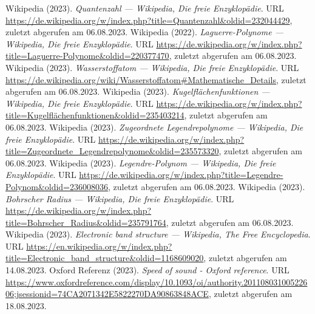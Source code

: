 \documentclass[../main.tex]{subfiles}
\begin{document}
\begin{thebibliography}{99}




		 Wikipedia (2023). \emph{Quantenzahl --- Wikipedia{,} Die freie Enzyklopädie}. URL \url{https://de.wikipedia.org/w/index.php?title=Quantenzahl&oldid=232044429}, zuletzt abgerufen am 06.08.2023. 
		 Wikipedia (2022). \emph{Laguerre-Polynome --- Wikipedia{,} Die freie Enzyklopädie}. URL \url{https://de.wikipedia.org/w/index.php?title=Laguerre-Polynome&oldid=220377470}, zuletzt abgerufen am 06.08.2023. 
		 Wikipedia (2023). \emph{Wasserstoffatom --- Wikipedia{,} Die freie Enzyklopädie}. URL \url{https://de.wikipedia.org/wiki/Wasserstoffatom#Mathematische_Details}, zuletzt abgerufen am 06.08.2023.
		 Wikipedia (2023). \emph{Kugelflächenfunktionen --- Wikipedia{,} Die freie Enzyklopädie}. URL \url{https://de.wikipedia.org/w/index.php?title=Kugelflächenfunktionen&oldid=235403214}, zuletzt abgerufen am 06.08.2023.
		 Wikipedia (2023). \emph{Zugeordnete Legendrepolynome --- Wikipedia{,} Die freie Enzyklopädie}. URL \url{https://de.wikipedia.org/w/index.php?title=Zugeordnete_Legendrepolynome&oldid=235573320}, zuletzt abgerufen am 06.08.2023.
		 Wikipedia (2023). \emph{Legendre-Polynom --- Wikipedia{,} Die freie Enzyklopädie}. URL \url{https://de.wikipedia.org/w/index.php?title=Legendre-Polynom&oldid=236008036}, zuletzt abgerufen am 06.08.2023.
		 Wikipedia (2023). \emph{Bohrscher Radius --- Wikipedia{,} Die freie Enzyklopädie}. URL \url{https://de.wikipedia.org/w/index.php?title=Bohrscher_Radius&oldid=235791764}, zuletzt abgerufen am 06.08.2023.
		 Wikipedia (2023). \emph{Electronic band structure --- Wikipedia{,} The Free Encyclopedia}. URL \url{https://en.wikipedia.org/w/index.php?title=Electronic_band_structure&oldid=1168609020}, zuletzt abgerufen am 14.08.2023.
		 Oxford Referenz (2023). \emph{Speed of sound - Oxford reference}. URL \url{https://www.oxfordreference.com/display/10.1093/oi/authority.20110803100522606;jsessionid=74CA2071342E5822270DA90863848ACE}, zuletzt abgerufen am 18.08.2023.


\end{thebibliography}
\end{document}
